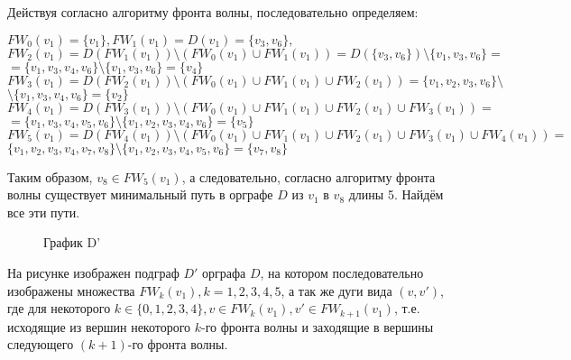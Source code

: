 \documentclass[12pt, letterpaper, titlepage]{article}
\begin{document}
Действуя согласно алгоритму фронта волны, последовательно определяем:

$FW_0(v_1)=\{v_1\}, FW_1(v_1)=D(v_1)=\{v_3,v_6\},$\\
$FW_2(v_1)=D(FW_1(v_1)) \setminus (FW_0(v_1) \cup FW_1(v_1))=D(\{v_3,v_6\}) \setminus \{v_1,v_3,v_6\}=$\\
$=\{v_1,v_3,v_4,v_6\} \setminus \{v_1,v_3,v_6\}=\{v_4\}$\\
$FW_3(v_1)=D(FW_2(v_1)) \setminus (FW_0(v_1)\cup FW_1(v_1)\cup FW_2(v_1))=\{v_1,v_2,v_3,v_6\} \setminus$\\
$\setminus \{v_1,v_3,v_4,v_6\}=\{v_2\}$\\
$FW_4(v_1)=D(FW_3(v_1)) \setminus (FW_0(v_1)\cup FW_1(v_1)\cup FW_2(v_1)\cup FW_3(v_1))=$\\
$=\{v_1,v_3,v_4,v_5,v_6\} \setminus \{v_1,v_2,v_3,v_4,v_6\}=\{v_5\}$\\
$FW_5(v_1)=D(FW_4(v_1)) \setminus (FW_0(v_1)\cup FW_1(v_1)\cup FW_2(v_1)\cup FW_3(v_1)\cup FW_4(v_1))=$\\
$\{v_1,v_2,v_3,v_4,v_7,v_8\}\setminus \{v_1,v_2,v_3,v_4,v_5,v_6\}=\{v_7,v_8\}$

Таким образом, $v_8 \in FW_5(v_1)$, а следовательно, согласно алгоритму фронта волны существует минимальный
путь в орграфе $D$ из $v_1$ в $v_8$ длины 5. Найдём все эти пути.
\begin{figure}[H]\centering\caption{График D'}\end{figure}
На рисунке изображен подграф $D'$ орграфа $D$, на котором последовательно изображены множества
$FW_k(v_1), k=1,2,3,4,5$, а так же  дуги вида $(v, v')$, где для некоторого $k \in \{0,1,2,3,4\},
v \in FW_k(v_1), v' \in FW_{k+1}(v_1)$, т.е. исходящие из вершин некоторого $k$-го фронта волны и
заходящие в вершины следующего $(k+1)$-го фронта волны.
\end{document}

